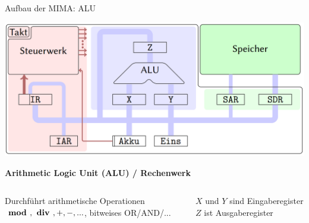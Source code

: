 \documentclass[handout]{beamer}
\begin{document}
\begin{frame}{Aufbau der MIMA: ALU}
	\begin{center}\includegraphics[width=.6\textwidth]{images/mima_aufbau.png}\end{center}
	
	\bp
	
	\textcolor{kit-blue50}{\textbf{Arithmetic Logic Unit (ALU) / Rechenwerk}}
	
	\begin{columns}
		\begin{column}{0.5\textwidth}
			\begin{itemize}
				\pitem Durchführt arithmetische Operationen
				\pitem $\textbf{ mod }, \textbf{ div }, +, -, ...$, bitweises OR/AND/...
			\end{itemize}
		\end{column}
		
		\begin{column}{0.5\textwidth}
			\begin{itemize}
				\pitem $X$ und $Y$ sind Eingaberegister
				\pitem $Z$ ist Ausgaberegister
			\end{itemize}
		\end{column}
	\end{columns}

\end{frame}
\end{document}
